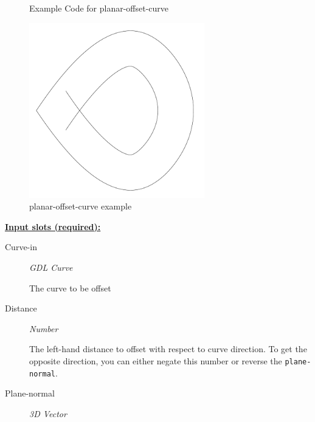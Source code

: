 \documentclass [11pt]{book}
\begin{document}
\begin{itemize}
\begin{figure}
\caption{Example Code for planar-offset-curve}

\label{fig:example-code-planar-offset-curve}

\end{figure}

\begin{figure}
\begin{center}
\includegraphics[width=3in,height=3in]{../images/example-planar-offset-curve.pdf}
\end{center}

\caption{planar-offset-curve example}

\label{fig:planar-offset-curve}

\end{figure}





\textbf{
\underline{Input slots (required):}}

\begin{description}

\item [Curve-in]
\emph{GDL Curve}

 The curve to be offset




\item [Distance]
\emph{Number}

 The left-hand distance to offset with respect to curve direction. To get the opposite
direction, you can either negate this number or reverse the \texttt{plane-normal}.




\item [Plane-normal]
\emph{3D Vector}


\end{description}
\end{itemize}
\end{document}
